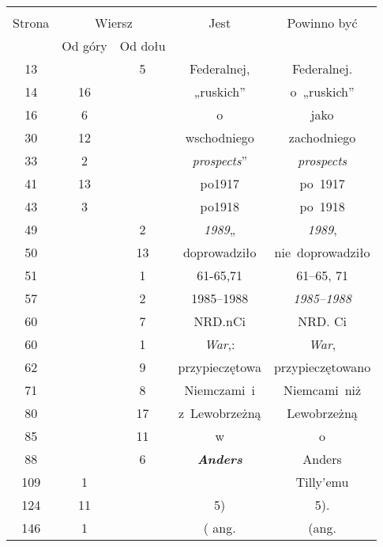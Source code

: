 \documentclass[a4paper,11pt]{article}
\begin{document}
\begin{center}

  \begin{tabular}{|c|c|c|c|c|}
    \hline
    & \multicolumn{2}{c|}{} & & \\
    Strona & \multicolumn{2}{c|}{Wiersz} & Jest
                              & Powinno być \\ \cline{2-3}
    & Od góry & Od dołu & & \\
    \hline
    13  & &  5 & Federalnej, & Federalnej. \\
    14  & 16 & & „ruskich” & o~„ruskich” \\
    16  &  6 & & o & jako \\
    30  & 12 & & wschodniego & zachodniego \\
    33  &  2 & & \textit{prospects}” & \textit{prospects} \\
    41  & 13 & & po1917 & po~1917 \\
    43  &  3 & & po1918 & po~1918 \\
    49  & &  2 & \textit{1989}„ & \textit{1989}, \\
    50  & & 13 & doprowadziło & nie~doprowadziło \\
    51  & &  1 & 61-65,71 & 61--65, 71 \\
    57  & &  2 & 1985--1988 & \textit{1985--1988} \\
    60  & &  7 & NRD.nCi & NRD. Ci \\
    60  & &  1 & \textit{War},: & \textit{War}, \\
    62  & &  9 & przypieczętowa & przypieczętowano \\
    71  & &  8 & Niemczami~i & Niemcami~niż \\
    80  & & 17 & z~Lewobrzeżną & Lewobrzeżną \\
    85  & & 11 & w & o \\
    88  & &  6 & \textbf{\textit{Anders}} & Anders \\
    109 &  1 & & & Tilly’emu \\
    124 & 11 & & 5) & 5). \\
    146 &  1 & & ( ang. & (ang. \\
    \hline
  \end{tabular}

\end{center}
\end{document}
